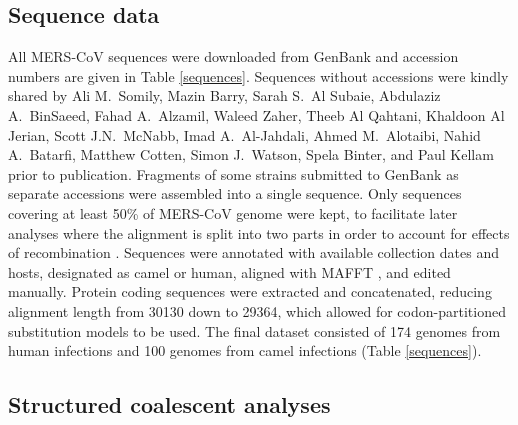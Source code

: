 \documentclass[11pt,oneside,letterpaper]{article}
\begin{document}
\subsection*{Sequence data}
All MERS-CoV sequences were downloaded from GenBank and accession numbers are given in Table \ref{sequences}.
Sequences without accessions were kindly shared by Ali M.\ Somily, Mazin Barry, Sarah S.\ Al Subaie, Abdulaziz A.\ BinSaeed, Fahad A.\ Alzamil, Waleed Zaher, Theeb Al Qahtani, Khaldoon Al Jerian, Scott J.N.\ McNabb, Imad A.\ Al-Jahdali, Ahmed M.\ Alotaibi, Nahid A.\ Batarfi, Matthew Cotten, Simon J.\ Watson, Spela Binter, and Paul Kellam prior to publication.
Fragments of some strains submitted to GenBank as separate accessions were assembled into a single sequence.
Only sequences covering at least 50\% of MERS-CoV genome were kept, to facilitate later analyses where the alignment is split into two parts in order to account for effects of recombination \citep{dudas_mers-cov_2016}.
Sequences were annotated with available collection dates and hosts, designated as camel or human, aligned with MAFFT \citep{katoh_mafft_2013}, and edited manually.
Protein coding sequences were extracted and concatenated, reducing alignment length from 30130 down to 29364, which allowed for codon-partitioned substitution models to be used.
The final dataset consisted of 174 genomes from human infections and 100 genomes from camel infections (Table \ref{sequences}).

\subsection*{Structured coalescent analyses}
\end{document}
